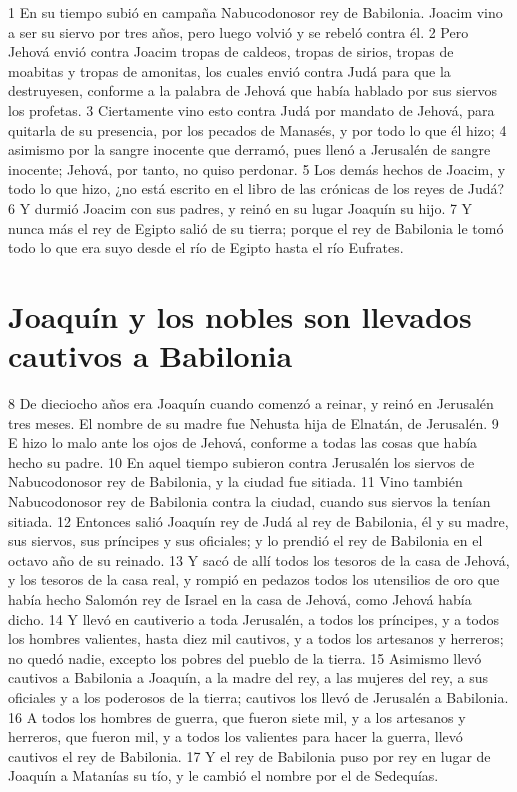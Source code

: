 1 En su tiempo subió en campaña Nabucodonosor rey de Babilonia. Joacim vino a ser su siervo por tres años, pero luego volvió y se rebeló contra él.
2 Pero Jehová envió contra Joacim tropas de caldeos, tropas de sirios, tropas de moabitas y tropas de amonitas, los cuales envió contra Judá para que la destruyesen, conforme a la palabra de Jehová que había hablado por sus siervos los profetas.
3 Ciertamente vino esto contra Judá por mandato de Jehová, para quitarla de su presencia, por los pecados de Manasés, y por todo lo que él hizo;
4 asimismo por la sangre inocente que derramó, pues llenó a Jerusalén de sangre inocente; Jehová, por tanto, no quiso perdonar.
5 Los demás hechos de Joacim, y todo lo que hizo, ¿no está escrito en el libro de las crónicas de los reyes de Judá?
6 Y durmió Joacim con sus padres, y reinó en su lugar Joaquín su hijo.
7 Y nunca más el rey de Egipto salió de su tierra; porque el rey de Babilonia le tomó todo lo que era suyo desde el río de Egipto hasta el río Eufrates.

\section*{Joaquín y los nobles son llevados cautivos a Babilonia}

8 De dieciocho años era Joaquín cuando comenzó a reinar, y reinó en Jerusalén tres meses. El nombre de su madre fue Nehusta hija de Elnatán, de Jerusalén.
9 E hizo lo malo ante los ojos de Jehová, conforme a todas las cosas que había hecho su padre.
10 En aquel tiempo subieron contra Jerusalén los siervos de Nabucodonosor rey de Babilonia, y la ciudad fue sitiada.
11 Vino también Nabucodonosor rey de Babilonia contra la ciudad, cuando sus siervos la tenían sitiada.
12 Entonces salió Joaquín rey de Judá al rey de Babilonia, él y su madre, sus siervos, sus príncipes y sus oficiales; y lo prendió el rey de Babilonia en el octavo año de su reinado. 
13 Y sacó de allí todos los tesoros de la casa de Jehová, y los tesoros de la casa real, y rompió en pedazos todos los utensilios de oro que había hecho Salomón rey de Israel en la casa de Jehová, como Jehová había dicho.
14 Y llevó en cautiverio a toda Jerusalén, a todos los príncipes, y a todos los hombres valientes, hasta diez mil cautivos, y a todos los artesanos y herreros; no quedó nadie, excepto los pobres del pueblo de la tierra.
15 Asimismo llevó cautivos a Babilonia a Joaquín, a la madre del rey, a las mujeres del rey, a sus oficiales y a los poderosos de la tierra; cautivos los llevó de Jerusalén a Babilonia. 
16 A todos los hombres de guerra, que fueron siete mil, y a los artesanos y herreros, que fueron mil, y a todos los valientes para hacer la guerra, llevó cautivos el rey de Babilonia.
17 Y el rey de Babilonia puso por rey en lugar de Joaquín a Matanías su tío, y le cambió el nombre por el de Sedequías. 

